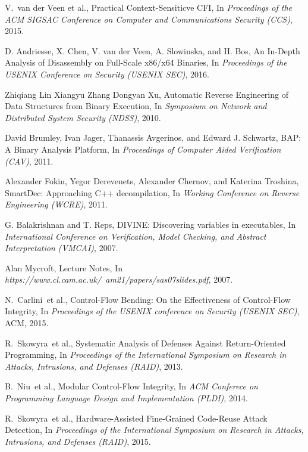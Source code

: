 \documentclass[11pt,a4paper,bibtotoc,idxtotoc,headsepline,footsepline,footexclude,BCOR12mm,DIV13]{scrbook}
\begin{document}
\begin{thebibliography}{50}
V.~van der Veen et al., {Practical Context-Sensiticve CFI}, In
\emph{Proceedings of the ACM SIGSAC Conference on Computer and Communications Security (CCS)}, 2015.

D. Andriesse, X. Chen, V. van der Veen, A. Slowinska, and H. Bos, 
{An In-Depth Analysis of Disassembly on Full-Scale x86/x64 Binaries}, In
\emph{Proceedings of the USENIX Conference on Security (USENIX SEC)}, 2016.

Zhiqiang Lin Xiangyu Zhang Dongyan Xu,
{Automatic Reverse Engineering of Data Structures from Binary Execution}, In
\emph{Symposium on Network and Distributed System Security (NDSS)}, 2010.

David Brumley, Ivan Jager, Thanassis Avgerinos, and Edward J. Schwartz,
{BAP: A Binary Analysis Platform}, 
In \emph{Proceedings of Computer Aided Verification (CAV)}, 2011.

Alexander Fokin, Yegor Derevenets, Alexander Chernov, and Katerina Troshina,
{SmartDec: Approaching C++ decompilation}, 
In \emph{Working Conference on Reverse Engineering (WCRE)}, 2011.

G. Balakrishnan and T. Reps,
{DIVINE: Discovering variables in executables}, 
In \emph{International Conference on Verification, Model Checking, and Abstract Interpretation (VMCAI)}, 2007.

Alan Mycroft,
{Lecture Notes}, 
In \emph{https://www.cl.cam.ac.uk/~am21/papers/sas07slides.pdf}, 2007.










N.~Carlini~et al., {Control-Flow Bending: On the Effectiveness of Control-Flow Integrity}, In
\emph{Proceedings of the USENIX conference on Security (USENIX SEC)}, ACM, 2015.

R.~Skowyra~et al., {Systematic Analysis of Defenses Against Return-Oriented Programming}, In
\emph{Proceedings of the International Symposium on Research in Attacks, Intrusions, and Defenses (RAID)}, 2013.

B.~Niu~et al., {Modular Control-Flow Integrity}, In
\emph{ACM Conferece on Programming Language Design and Implementation (PLDI)}, 2014.

R.~Skowyra~et al., {Hardware-Assisted Fine-Grained Code-Reuse Attack Detection}, In
\emph{Proceedings of the International Symposium on Research in Attacks, Intrusions, and Defenses (RAID)}, 2015.


\end{thebibliography}
\end{document}
